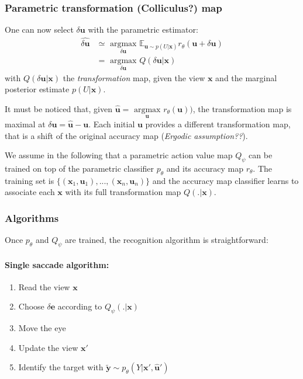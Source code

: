 \subsubsection{Parametric transformation (Colliculus?) map}

One can now select $\delta\boldsymbol{u}$ with the parametric estimator:
\begin{align*}
\widehat{\delta\boldsymbol{u}} &\simeq \underset{\delta\boldsymbol{u}}{\text{ argmax }} 
\mathbb{E}_{\boldsymbol{u}\sim p(U|\boldsymbol{x})}  
r_\theta(\boldsymbol{u}+\delta\boldsymbol{u})\\
&= \underset{\delta\boldsymbol{u}}{\text{ argmax }} Q(\delta\boldsymbol{u}|\boldsymbol{x})
\end{align*}
with $Q(\delta\boldsymbol{u}|\boldsymbol{x})$ the \emph{transformation} map, given the view $\boldsymbol{x}$ and the marginal posterior estimate $p(U|\boldsymbol{x})$. 

It must be noticed that, given $\hat{\boldsymbol{u}} = \underset{\boldsymbol{u}}{\text{ argmax }} 
r_\theta(\boldsymbol{u}))$,  the transformation map is maximal at $\delta\boldsymbol{u} = \hat{\boldsymbol{u}} - \boldsymbol{u}$. Each initial $\boldsymbol{u}$ provides a different transformation map, that is a shift of the original accuracy map (\emph{Ergodic assumption??}).
 
We assume in the following that a parametric action value map $Q_\psi$ can be trained on top of the parametric classifier $p_\theta$ and its accuracy map $r_\theta$.
The training set is $\{(\boldsymbol{x}_1, \boldsymbol{u}_1), ..., (\boldsymbol{x}_n, \boldsymbol{u}_n)\}$ and the accuracy map classifier learns to associate each $\boldsymbol{x}$ with its full transformation map $Q(.|\boldsymbol{x})$. 



\subsubsection{Algorithms}

Once $p_\theta$ and $Q_\psi$ are trained, the recognition algorithm is straightforward:  

\paragraph{Single saccade algorithm:}
\begin{enumerate}
	\item Read the view $\boldsymbol{x}$
	\item Choose $\delta\boldsymbol{e}$ according to $Q_\psi(.|\boldsymbol{x})$
	\item Move the eye 
	\item Update the view $\boldsymbol{x}'$
	\item Identify the target with $\tilde{\boldsymbol{y}} \sim p_\theta(Y|\boldsymbol{x}',\hat{\boldsymbol{u}}')$
\end{enumerate}


